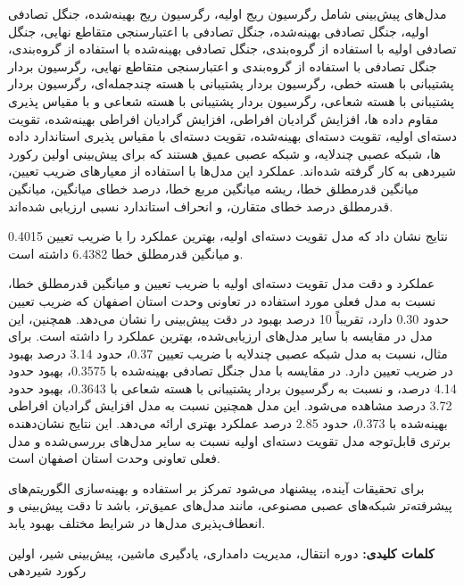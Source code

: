 \begin{small}
مدل‌های پیش‌بینی شامل رگرسیون ریج اولیه، رگرسیون ریج بهینه‌شده، جنگل تصادفی اولیه، جنگل تصادفی بهینه‌شده، جنگل تصادفی با اعتبارسنجی متقاطع نهایی،  جنگل تصادفی اولیه با استفاده از گروه‌بندی، جنگل تصادفی بهینه‌شده با استفاده از گروه‌بندی، جنگل تصادفی با استفاده از گروه‌بندی و اعتبارسنجی متقاطع نهایی، رگرسیون بردار پشتیبانی با هسته خطی، رگرسیون بردار پشتیبانی با هسته چندجمله‌ای، رگرسیون بردار پشتیبانی با هسته شعاعی، رگرسیون بردار پشتیبانی با هسته شعاعی و با مقیاس پذیری مقاوم داده ها، افزایش گرادیان افراطی، افزایش گرادیان افراطی بهینه‌شده، تقویت دسته‌ای اولیه، تقویت دسته‌ای بهینه‌شده، تقویت دسته‌ای با مقیاس پذیری استاندارد داده ها، شبکه عصبی چندلایه، و شبکه عصبی عمیق هستند که برای پیش‌بینی اولین رکورد شیردهی به کار گرفته شده‌اند. عملکرد این مدل‌ها با استفاده از معیارهای ضریب تعیین، میانگین قدرمطلق خطا، ریشه میانگین مربع خطا، درصد خطای میانگین، میانگین قدرمطلق درصد خطای متقارن، و انحراف استاندارد نسبی ارزیابی شده‌اند. 

نتایج نشان داد که مدل تقویت دسته‌ای اولیه، بهترین عملکرد را با ضریب تعیین \num{0.4015} و میانگین قدرمطلق خطا \num{6.4382} داشته است.

عملکرد و دقت مدل تقویت دسته‌ای اولیه با ضریب تعیین و میانگین قدرمطلق خطا، نسبت به مدل فعلی مورد استفاده در تعاونی وحدت استان اصفهان که ضریب تعیین حدود \num{0.30} دارد، تقریباً 10 درصد بهبود در دقت پیش‌بینی را نشان می‌دهد. همچنین، این مدل در مقایسه با سایر مدل‌های ارزیابی‌شده، بهترین عملکرد را داشته است. برای مثال، نسبت به مدل شبکه عصبی چندلایه با ضریب تعیین \num{0.37}، حدود \num{3.14} درصد بهبود در ضریب تعیین دارد. در مقایسه با مدل جنگل تصادفی بهینه‌شده با \num{0.3575}، بهبود حدود \num{4.14} درصد، و نسبت به رگرسیون بردار پشتیبانی با هسته شعاعی با \num{0.3643}، بهبود حدود \num{3.72} درصد مشاهده می‌شود. این مدل همچنین نسبت به مدل افزایش گرادیان افراطی بهینه‌شده با \num{0.373}، حدود \num{2.85} درصد عملکرد بهتری ارائه می‌دهد. این نتایج نشان‌دهنده برتری قابل‌توجه مدل تقویت دسته‌ای اولیه نسبت به سایر مدل‌های بررسی‌شده و مدل فعلی تعاونی وحدت استان اصفهان است.

برای تحقیقات آینده، پیشنهاد می‌شود تمرکز بر استفاده و بهینه‌سازی الگوریتم‌های پیشرفته‌تر شبکه‌های عصبی مصنوعی، مانند مدل‌های عمیق‌تر، باشد تا دقت پیش‌بینی و انعطاف‌پذیری مدل‌ها در شرایط مختلف بهبود یابد.
\vspace{0.5cm}

\noindent\textbf{کلمات کلیدی:} دوره انتقال، مدیریت دامداری، یادگیری ماشین، پیش‌بینی شیر، اولین رکورد شیردهی

\end{small}